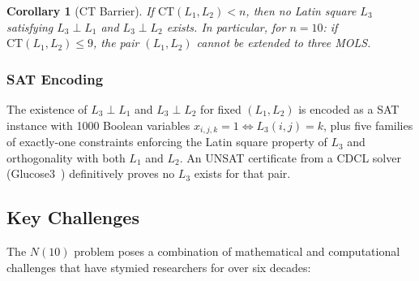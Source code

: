 \documentclass[11pt,a4paper]{article}
\newtheorem{corollary}[theorem]{Corollary}
\theoremstyle{remark}
\newcommand{\CT}{\mathrm{CT}}
\begin{document}
\begin{corollary}[CT Barrier]\label{cor:ct_barrier}
If $\CT(L_1, L_2) < n$, then no Latin square $L_3$ satisfying $L_3 \perp L_1$ and
$L_3 \perp L_2$ exists. In particular, for $n = 10$: if $\CT(L_1, L_2) \leq 9$, the
pair $(L_1, L_2)$ cannot be extended to three MOLS.
\end{corollary}

\subsubsection{SAT Encoding}

The existence of $L_3 \perp L_1$ and $L_3 \perp L_2$ for fixed $(L_1, L_2)$ is encoded
as a SAT instance with 1000 Boolean variables $x_{i,j,k} = 1 \iff L_3(i,j) = k$, plus
five families of exactly-one constraints enforcing the Latin square property of $L_3$ and
orthogonality with both $L_1$ and $L_2$. An UNSAT certificate from a CDCL solver
(Glucose3~\cite{audemard2009}) definitively proves no $L_3$ exists for that pair.

\subsection{Key Challenges}

The $N(10)$ problem poses a combination of mathematical and computational challenges that
have stymied researchers for over six decades:
\end{document}
